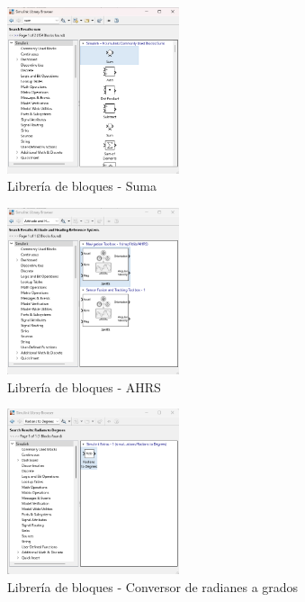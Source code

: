 \begin{figure}[h!]
    \centering
    \includegraphics[width=0.45\textwidth]{fig/Capitulo5/Caso_de_estudio_IMU/Generador_de_salidas/libreia_de_bloques_suma.png}
    \caption{Librería de bloques - Suma}
    \label{fig:lib_bloques_add}
\end{figure}

\begin{figure}[h!]
    \centering
    \includegraphics[width=0.45\textwidth]{fig/Capitulo5/Caso_de_estudio_IMU/Generador_de_salidas/libreira_de_bloques_sensor_AHRS.png}
    \caption{Librería de bloques - AHRS}
    \label{fig:lib_bloques_AHRS}
\end{figure}

\begin{figure}[h!]
    \centering
    \includegraphics[width=0.45\textwidth]{fig/Capitulo5/Caso_de_estudio_IMU/Generador_de_salidas/libreria_bloque__rad_2_deg.png}
    \caption{Librería de bloques - Conversor de radianes a grados}
    \label{fig:lib_bloques_R2D}
\end{figure}

